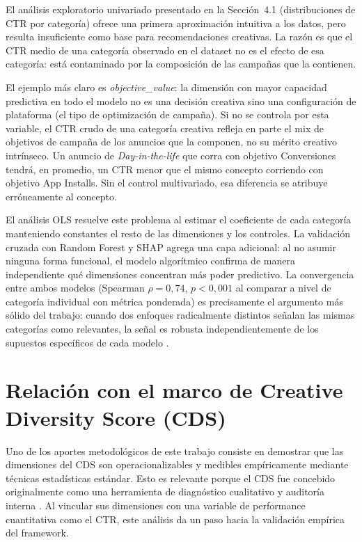 \documentclass[12pt, a4paper]{report}
\begin{document}
El análisis exploratorio univariado presentado en la Sección~4.1 (distribuciones de CTR
por categoría) ofrece una primera aproximación intuitiva a los datos, pero resulta
insuficiente como base para recomendaciones creativas. La razón es que el CTR medio de
una categoría observado en el dataset no es el efecto de esa categoría: está contaminado
por la composición de las campañas que la contienen.

El ejemplo más claro es \textit{objective\_value}: la dimensión con mayor capacidad
predictiva en todo el modelo no es una decisión creativa sino una configuración de
plataforma (el tipo de optimización de campaña). Si no se controla por esta variable, el
CTR crudo de una categoría creativa refleja en parte el mix de objetivos de campaña de
los anuncios que la componen, no su mérito creativo intrínseco. Un anuncio de
\textit{Day-in-the-life} que corra con objetivo Conversiones tendrá, en promedio, un CTR
menor que el mismo concepto corriendo con objetivo App Installs. Sin el control
multivariado, esa diferencia se atribuye erróneamente al concepto.

El análisis OLS resuelve este problema al estimar el coeficiente de cada categoría
manteniendo constantes el resto de las dimensiones y los controles. La validación cruzada
con Random Forest y SHAP agrega una capa adicional: al no asumir ninguna forma
funcional, el modelo algorítmico confirma de manera independiente qué dimensiones
concentran más poder predictivo. La convergencia entre ambos modelos (Spearman
$\rho = 0{,}74$, $p < 0{,}001$ al comparar a nivel de categoría individual con métrica
ponderada) es precisamente el argumento más sólido del trabajo: cuando dos enfoques
radicalmente distintos señalan las mismas categorías como relevantes, la señal es robusta
independientemente de los supuestos específicos de cada modelo \citep{breiman2001b}.

\section{Relación con el marco de Creative Diversity Score (CDS)}

Uno de los aportes metodológicos de este trabajo consiste en demostrar que las
dimensiones del CDS son operacionalizables y medibles empíricamente mediante técnicas
estadísticas estándar. Esto es relevante porque el CDS fue concebido originalmente como
una herramienta de diagnóstico cualitativo y auditoría interna \citep{readyset2025}. Al
vincular sus dimensiones con una variable de performance cuantitativa como el CTR, este
análisis da un paso hacia la validación empírica del framework.
\end{document}

